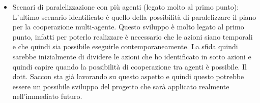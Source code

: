 \begin{itemize}
      \item Scenari di paralelizzazione con più agenti (legato molto al primo punto): L'ultimo scenario identificato è quello della possibilità di paralelizzare il piano per la cooperazione multi-agente.
      Questo sviluppo è molto legato al primo punto, infatti per poterlo realizzare è necessario che le azioni siano temporali e che quindi sia possibile eseguirle contemporaneamente.
      La sfida quindi sarebbe inizialmente di dividere le azioni che ho identificato in sotto azioni e quindi capire quando la possibilità di cooperazione tra agenti è possibile. 
      Il dott. Saccon sta già lavorando su questo aspetto e quindi questo potrebbe essere un possibile sviluppo del progetto che sarà applicato realmente nell'immediato futuro.
      
\end{itemize}





